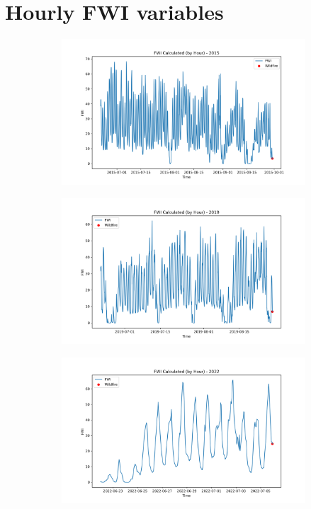 \section{Hourly FWI variables}
\begin{figure}[h]
	\centering
	\caption{Calculated hourly FWI value for 2015, 2019, and 2022}
	\begin{subfigure}{0.45\textwidth}
		\centering
		\includegraphics[width=\textwidth]{graphs/2015/byHour/2015CalcFWI12.png}
	\end{subfigure}
	\hfill
	\begin{subfigure}{0.45\textwidth}
		\centering
		\includegraphics[width=\textwidth]{graphs/2019/byHour/2019CalcFWI12.png}
	\end{subfigure}
	
	\begin{subfigure}{0.45\textwidth}
		\centering
		\includegraphics[width=\textwidth]{graphs/2022/2022CalcFWI12.png}
	\end{subfigure}
	

\end{figure}
